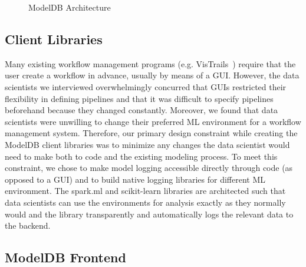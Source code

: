 \documentclass[11pt]{article}
\newcommand{\mdb}{{\sc ModelDB}\xspace}
\newcommand{\dss}{data scientists\xspace}
\newcommand{\ds}{data scientist\xspace}
\begin{document}
\begin{figure}[tb] 
\centerline{
\hbox{}}
\caption{ModelDB Architecture}
\label{fig:mdb_arch}
\end{figure}

\subsection{Client Libraries}
Many existing workflow management programs (e.g. VisTrails~\cite{callahan2006vistrails}) require that the user create a workflow in advance, usually by means of a GUI. 
However, the \dss we interviewed overwhelmingly concurred that GUIs restricted their flexibility in defining pipelines and that it was difficult to specify pipelines beforehand because they changed constantly. 
Moreover, we found that \dss were unwilling to change their preferred ML environment for a workflow management system. Therefore, our primary design constraint while creating the \mdb client libraries was to minimize any changes the \ds would need to make both to code and the existing modeling process. To meet this constraint, we chose to make model logging accessible directly through code (as opposed to a GUI) and to build native logging libraries for different ML environment. The spark.ml and scikit-learn libraries are architected such that \dss can use the environments for analysis exactly as they normally would and the library transparently and automatically logs the relevant data to the backend.

\subsection{\mdb Frontend}
\label{sec:mdb_frontend}
\end{document}
